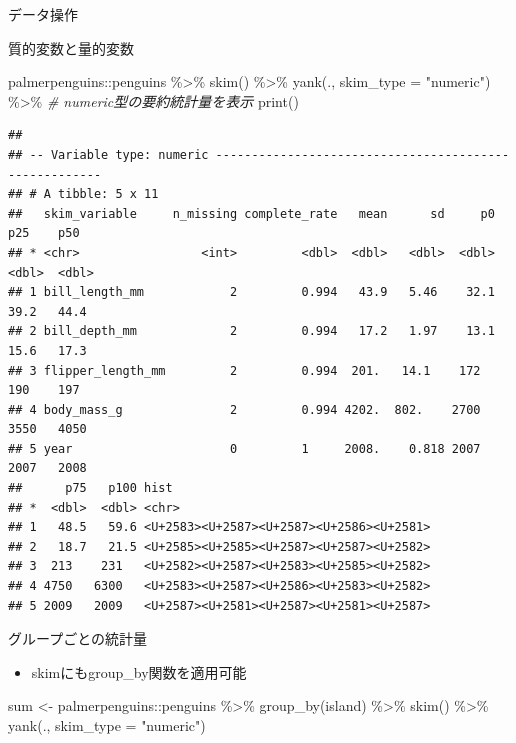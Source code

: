 \documentclass[
  ignorenonframetext,
]{beamer}
\newenvironment{Shaded}{\begin{snugshade}}{\end{snugshade}}
\newcommand{\AttributeTok}[1]{\textcolor[rgb]{0.77,0.63,0.00}{#1}}
\newcommand{\CommentTok}[1]{\textcolor[rgb]{0.56,0.35,0.01}{\textit{#1}}}
\newcommand{\FunctionTok}[1]{\textcolor[rgb]{0.00,0.00,0.00}{#1}}
\newcommand{\NormalTok}[1]{#1}
\newcommand{\OtherTok}[1]{\textcolor[rgb]{0.56,0.35,0.01}{#1}}
\newcommand{\SpecialCharTok}[1]{\textcolor[rgb]{0.00,0.00,0.00}{#1}}
\newcommand{\StringTok}[1]{\textcolor[rgb]{0.31,0.60,0.02}{#1}}
\providecommand{\tightlist}{%
  \setlength{\itemsep}{0pt}\setlength{\parskip}{0pt}}
\begin{document}
\begin{frame}[fragile]{データ操作}
\begin{block}{質的変数と量的変数}
\begin{Shaded}
\begin{Highlighting}[]
\NormalTok{palmerpenguins}\SpecialCharTok{::}\NormalTok{penguins }\SpecialCharTok{\%\textgreater{}\%}
  \FunctionTok{skim}\NormalTok{() }\SpecialCharTok{\%\textgreater{}\%}
  \FunctionTok{yank}\NormalTok{(., }\AttributeTok{skim\_type =} \StringTok{"numeric"}\NormalTok{) }\SpecialCharTok{\%\textgreater{}\%} \CommentTok{\# numeric型の要約統計量を表示}
  \FunctionTok{print}\NormalTok{()}
\end{Highlighting}
\end{Shaded}

\begin{verbatim}
## 
## -- Variable type: numeric ------------------------------------------------------
## # A tibble: 5 x 11
##   skim_variable     n_missing complete_rate   mean      sd     p0    p25    p50
## * <chr>                 <int>         <dbl>  <dbl>   <dbl>  <dbl>  <dbl>  <dbl>
## 1 bill_length_mm            2         0.994   43.9   5.46    32.1   39.2   44.4
## 2 bill_depth_mm             2         0.994   17.2   1.97    13.1   15.6   17.3
## 3 flipper_length_mm         2         0.994  201.   14.1    172    190    197  
## 4 body_mass_g               2         0.994 4202.  802.    2700   3550   4050  
## 5 year                      0         1     2008.    0.818 2007   2007   2008  
##      p75   p100 hist 
## *  <dbl>  <dbl> <chr>
## 1   48.5   59.6 <U+2583><U+2587><U+2587><U+2586><U+2581>
## 2   18.7   21.5 <U+2585><U+2585><U+2587><U+2587><U+2582>
## 3  213    231   <U+2582><U+2587><U+2583><U+2585><U+2582>
## 4 4750   6300   <U+2583><U+2587><U+2586><U+2583><U+2582>
## 5 2009   2009   <U+2587><U+2581><U+2587><U+2581><U+2587>
\end{verbatim}
\end{block}

\begin{block}{グループごとの統計量}
\protect\hypertarget{ux30b0ux30ebux30fcux30d7ux3054ux3068ux306eux7d71ux8a08ux91cf}{}
\begin{itemize}
\tightlist
\item
  skimにもgroup\_by関数を適用可能
\end{itemize}

\begin{Shaded}
\begin{Highlighting}[]
\NormalTok{sum }\OtherTok{\textless{}{-}}\NormalTok{ palmerpenguins}\SpecialCharTok{::}\NormalTok{penguins }\SpecialCharTok{\%\textgreater{}\%}
  \FunctionTok{group\_by}\NormalTok{(island) }\SpecialCharTok{\%\textgreater{}\%}
  \FunctionTok{skim}\NormalTok{() }\SpecialCharTok{\%\textgreater{}\%}
  \FunctionTok{yank}\NormalTok{(., }\AttributeTok{skim\_type =} \StringTok{"numeric"}\NormalTok{)}


\end{Highlighting}
\end{Shaded}
\end{block}
\end{frame}
\end{document}
